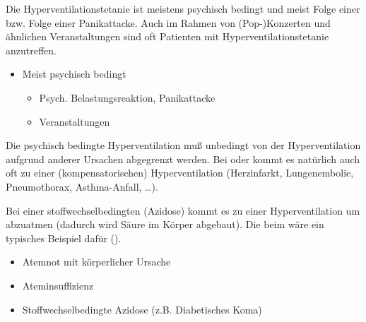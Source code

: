 {
Die Hyperventilationstetanie ist meistens psychisch bedingt und meist Folge
einer  bzw. Folge einer Panikattacke. Auch
im Rahmen von (Pop-)Konzerten und ähnlichen Veranstaltungen sind oft Patienten mit
Hyperventilationstetanie anzutreffen.

}{
\begin{itemize}
  \item Meist psychisch bedingt
  \begin{itemize}
    \item Psych. Belastungsreaktion, Panikattacke
    \item Veranstaltungen
  \end{itemize}
\end{itemize}
}{}{}{}

{
Die psychisch bedingte Hyperventilation muß unbedingt von der Hyperventilation
aufgrund anderer Ursachen abgegrenzt werden. Bei  oder
 kommt es natürlich auch oft zu
einer (kompensatorischen) Hyperventilation (Herzinfarkt, Lungenembolie, Pneumothorax,
Asthma-Anfall, \ldots). 

Bei einer stoffwechselbedingten  (Azidose) kommt es zu einer
Hyperventilation um  abzuatmen (dadurch wird Säure im Körper abgebaut). Die  beim  wäre ein typisches
Beispiel dafür ().

}{
\begin{itemize}
  \item Atemnot mit körperlicher Ursache 
  \item Ateminsuffizienz 
  \item Stoffwechselbedingte Azidose (z.B. Diabetisches Koma)
\end{itemize}
}{}{}{}


% 

